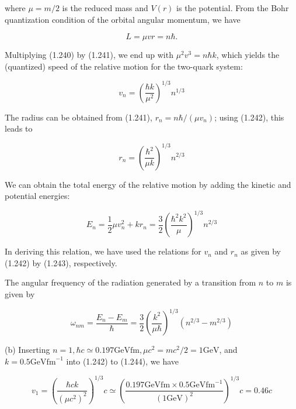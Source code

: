 \documentclass[10pt]{article}
\begin{document}
where $\mu=m / 2$ is the reduced mass and $V(r)$ is the potential. From the Bohr quantization condition of the orbital angular momentum, we have


\begin{equation*}
L=\mu v r=n \hbar . \tag{1.241}
\end{equation*}


Multiplying (1.240) by (1.241), we end up with $\mu^{2} v^{3}=n \hbar k$, which yields the (quantized) speed of the relative motion for the two-quark system:


\begin{equation*}
v_{n}=\left(\frac{\hbar k}{\mu^{2}}\right)^{1 / 3} n^{1 / 3} \tag{1.242}
\end{equation*}


The radius can be obtained from (1.241), $r_{n}=n \hbar /\left(\mu v_{n}\right)$; using (1.242), this leads to


\begin{equation*}
r_{n}=\left(\frac{\hbar^{2}}{\mu k}\right)^{1 / 3} n^{2 / 3} \tag{1.243}
\end{equation*}


We can obtain the total energy of the relative motion by adding the kinetic and potential energies:


\begin{equation*}
E_{n}=\frac{1}{2} \mu v_{n}^{2}+k r_{n}=\frac{3}{2}\left(\frac{\hbar^{2} k^{2}}{\mu}\right)^{1 / 3} n^{2 / 3} \tag{1.244}
\end{equation*}


In deriving this relation, we have used the relations for $v_{n}$ and $r_{n}$ as given by (1.242) by (1.243), respectively.

The angular frequency of the radiation generated by a transition from $n$ to $m$ is given by


\begin{equation*}
\omega_{n m}=\frac{E_{n}-E_{m}}{\hbar}=\frac{3}{2}\left(\frac{k^{2}}{\mu \hbar}\right)^{1 / 3}\left(n^{2 / 3}-m^{2 / 3}\right) \tag{1.245}
\end{equation*}


(b) Inserting $n=1, \hbar c \simeq 0.197 \mathrm{GeV} \mathrm{fm}, \mu c^{2}=m c^{2} / 2=1 \mathrm{GeV}$, and $k=0.5 \mathrm{GeV} \mathrm{fm}^{-1}$ into (1.242) to (1.244), we have


\begin{equation*}
v_{1}=\left(\frac{\hbar c k}{\left(\mu c^{2}\right)^{2}}\right)^{1 / 3} c \simeq\left(\frac{0.197 \mathrm{GeV} \mathrm{fm} \times 0.5 \mathrm{GeV} \mathrm{fm}^{-1}}{(1 \mathrm{GeV})^{2}}\right)^{1 / 3} c=0.46 c \tag{1.246}
\end{equation*}
\end{document}

